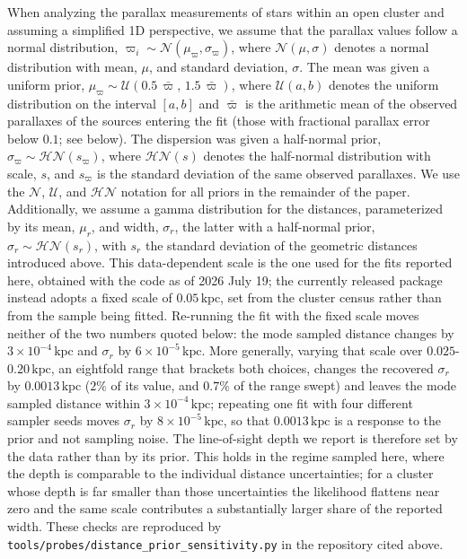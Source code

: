 \documentclass{aa}
\providecommand{\DIFaddtex}[1]{{\protect\color{red}\uwave{#1}}} %
\providecommand{\DIFaddbegin}{} %
\providecommand{\DIFaddend}{} %
\providecommand{\DIFadd}[1]{\texorpdfstring{\DIFaddtex{#1}}{#1}} %
\providecommand{\DIFaddincludegraphics}[2][]{{\color{blue}\fbox{\DIFOincludegraphics[#1]{#2}}}} %
\DeclareRobustCommand{\DIFaddbegin}{\DIFOaddbegin \let\includegraphics\DIFaddincludegraphics} %
\DeclareRobustCommand{\DIFaddend}{\DIFOaddend \let\includegraphics\DIFOincludegraphics} %
\begin{document}
When analyzing the parallax measurements of stars within an open cluster and assuming a simplified 1D perspective, we assume\DIFaddbegin \DIFadd{d}\DIFaddend{}  that the parallax values follow a normal distribution, $\varpi_i \sim \mathcal{N}(\mu_\varpi,\sigma_\varpi)$, where $\mathcal{N}(\mu,\sigma)$ denotes a normal distribution with mean, $\mu$, and standard deviation, $\sigma$. The mean was given a uniform prior, $\mu_\varpi \sim \mathcal{U}(0.5\,\bar{\varpi},\,1.5\,\bar{\varpi})$, where $\mathcal{U}(a,b)$ denotes the uniform distribution on the interval $[a,b]$ and $\bar{\varpi}$ is the arithmetic mean of the observed parallaxes of the sources entering the fit (those with fractional parallax error below $0.1$; see below). The dispersion was given a half-normal prior, $\sigma_\varpi \sim \mathcal{HN}(s_\varpi)$, where $\mathcal{HN}(s)$ denotes the half-normal distribution with scale, $s$, and $s_\varpi$ is the standard deviation of the same observed parallaxes. We use the $\mathcal{N}$, $\mathcal{U}$, and $\mathcal{HN}$ notation for all priors in the remainder of the paper. Additionally, we assume\DIFaddbegin \DIFadd{d}\DIFaddend{}  a gamma distribution for the distances, parameterized by its mean, $\mu_r$, and width, $\sigma_r$, the latter with a half-normal prior, $\sigma_r \sim \mathcal{HN}(s_r)$, with $s_r$ the standard deviation of the geometric distances introduced above. This data-dependent scale is the one used for the fits reported here, obtained with the code as of 2026 July 19; the currently released package instead adopts a fixed scale of $0.05\,\mathrm{kpc}$, set from the \citet{2024arXiv240305143H} cluster census rather than from the sample being fitted. Re-running the fit with the fixed scale moves neither of the two numbers quoted below: the mode sampled distance changes by $3\times10^{-4}\,\mathrm{kpc}$ and $\sigma_r$ by $6\times10^{-5}\,\mathrm{kpc}$. More generally, varying that scale over $0.025$-\DIFaddbegin \DIFadd{-}\DIFaddend  $0.20\,\mathrm{kpc}$, an eightfold range that brackets both choices, changes the recovered $\sigma_r$ by $0.0013\,\mathrm{kpc}$ ($2\%$ of its value, and $0.7\%$ of the range swept) and leaves the mode sampled distance within $3\times10^{-4}\,\mathrm{kpc}$; repeating one fit with four different sampler seeds moves $\sigma_r$ by $8\times10^{-5}\,\mathrm{kpc}$, so that $0.0013\,\mathrm{kpc}$ is a response to the prior and not sampling noise. The line-of-sight depth we report is therefore set by the data rather than by its prior. This holds in the regime sampled here, where the depth is comparable to the individual distance uncertainties; for a cluster whose depth is far smaller than those uncertainties the likelihood flattens near zero and the same scale contributes a substantially larger share of the reported width. These checks are reproduced by \texttt{tools/probes/distance\_prior\_sensitivity.py} in the repository cited above.
\end{document}
